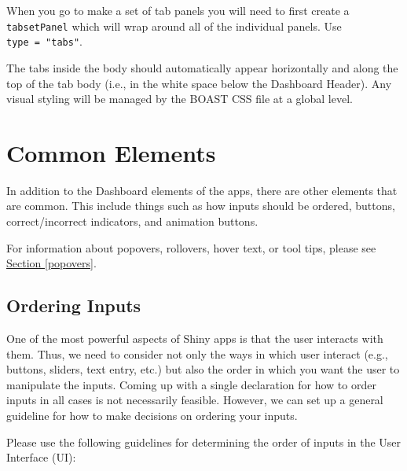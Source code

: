 \documentclass[
]{book}
\begin{document}
When you go to make a set of tab panels you will need to first create a \texttt{tabsetPanel} which will wrap around all of the individual panels. Use \texttt{type\ =\ "tabs"}.

The tabs inside the body should automatically appear horizontally and along the top of the tab body (i.e., in the white space below the Dashboard Header). Any visual styling will be managed by the BOAST CSS file at a global level.

\hypertarget{common-elements-1}{%
\section{Common Elements}\label{common-elements-1}}

In addition to the Dashboard elements of the apps, there are other elements that are common. This include things such as how inputs should be ordered, buttons, correct/incorrect indicators, and animation buttons.

For information about popovers, rollovers, hover text, or tool tips, please see \protect\hyperlink{popovers}{Section \ref{popovers}}.

\hypertarget{ordering-inputs-1}{%
\subsection{Ordering Inputs}\label{ordering-inputs-1}}

One of the most powerful aspects of Shiny apps is that the user interacts with them. Thus, we need to consider not only the ways in which user interact (e.g., buttons, sliders, text entry, etc.) but also the order in which you want the user to manipulate the inputs. Coming up with a single declaration for how to order inputs in all cases is not necessarily feasible. However, we can set up a general guideline for how to make decisions on ordering your inputs.

Please use the following guidelines for determining the order of inputs in the User Interface (UI):
\end{document}
